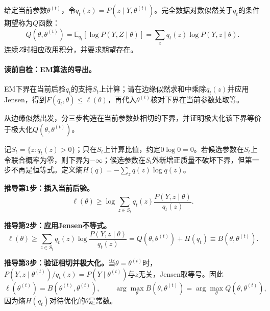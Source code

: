 \begin{definition}[$Q$函数]\label{def:V3-C04-Q}
给定当前参数$\theta^{(t)}$，令$q_t(z)=P(z\mid Y,\theta^{(t)})$。完全数据对数似然关于$q_t$的条件期望称为$Q$函数：
\[
Q(\theta,\theta^{(t)})
=\mathbb E_{q_t}\!\left[\log P(Y,Z\mid\theta)\right]
=\sum_zq_t(z)\log P(Y,z\mid\theta).
\]
连续$Z$时相应改用积分，并要求期望存在。
\end{definition}

\paragraph{读前自检：EM算法的导出。}EM下界在当前后验$q_t$的支持$S_t$上计算；请在边缘似然求和中乘除$q_t(z)$并应用Jensen，得到$F(q_t,\theta)\le\ell(\theta)$，再代入$\theta^{(t)}$核对下界在当前参数处取等。\par

\label{struct:V3-C04-CH11}

\begin{derivationgoalbox}
从边缘似然出发，分三步构造在当前参数处相切的下界，并证明极大化该下界等价于极大化$Q(\theta,\theta^{(t)})$。
\end{derivationgoalbox}
\begin{derivationprepbox}
记$S_t=\{z:q_t(z)>0\}$；只在$S_t$上计算比值，约定$0\log0=0$。若候选参数在$S_t$上令联合概率为零，则下界为$-\infty$；候选参数在$S_t$外新增正质量不破坏下界，但第一步不再是恒等式。定义熵$H(q)=-\sum_zq(z)\log q(z)$。
\end{derivationprepbox}
\textbf{推导第1步：插入当前后验。}
\[
\ell(\theta)\geq\log\sum_{z\in S_t}q_t(z)
\frac{P(Y,z\mid\theta)}{q_t(z)}.
\]

\textbf{推导第2步：应用Jensen不等式。}
\[
\ell(\theta)\geq
\sum_{z\in S_t}q_t(z)\log\frac{P(Y,z\mid\theta)}{q_t(z)}
=Q(\theta,\theta^{(t)})+H(q_t)
\equiv B(\theta,\theta^{(t)}).
\]

\textbf{推导第3步：验证相切并极大化。}当$\theta=\theta^{(t)}$时，
$P(Y,z\mid\theta^{(t)})/q_t(z)=P(Y\mid\theta^{(t)})$与$z$无关，Jensen取等号。因此
\[
\ell(\theta^{(t)})=B(\theta^{(t)},\theta^{(t)}),\qquad
\arg\max_\theta B(\theta,\theta^{(t)})
=\arg\max_\theta Q(\theta,\theta^{(t)}),
\]
因为熵$H(q_t)$对待优化的$\theta$是常数。

